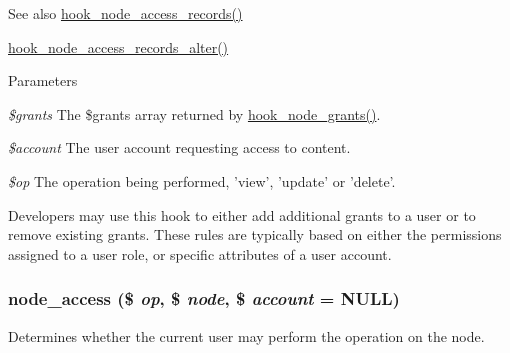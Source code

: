 \begin{DoxySeeAlso}{See also}
\hyperlink{group__node__access_ga3fe7744d74446e40e9b9ad2a782b4269}{hook\_\-node\_\-access\_\-records()} 

\hyperlink{group__node__access_ga37c90bf0e1dccad0deefa368dd94cc83}{hook\_\-node\_\-access\_\-records\_\-alter()}
\end{DoxySeeAlso}

\begin{DoxyParams}{Parameters}
\item[{\em \$grants}]The \$grants array returned by \hyperlink{group__node__access_gaa973f2ab6ab14c3fa14e5138c6d69ecf}{hook\_\-node\_\-grants()}. \item[{\em \$account}]The user account requesting access to content. \item[{\em \$op}]The operation being performed, 'view', 'update' or 'delete'.\end{DoxyParams}
Developers may use this hook to either add additional grants to a user or to remove existing grants. These rules are typically based on either the permissions assigned to a user role, or specific attributes of a user account. \hypertarget{group__node__access_ga46f0f1ed812befada8f8e7d1b8c352db}{
\subsubsection[{node\_\-access}]{\setlength{\rightskip}{0pt plus 5cm}node\_\-access (\$ {\em op}, \/  \$ {\em node}, \/  \$ {\em account} = {\ttfamily NULL})}}
\label{group__node__access_ga46f0f1ed812befada8f8e7d1b8c352db}
Determines whether the current user may perform the operation on the node.


